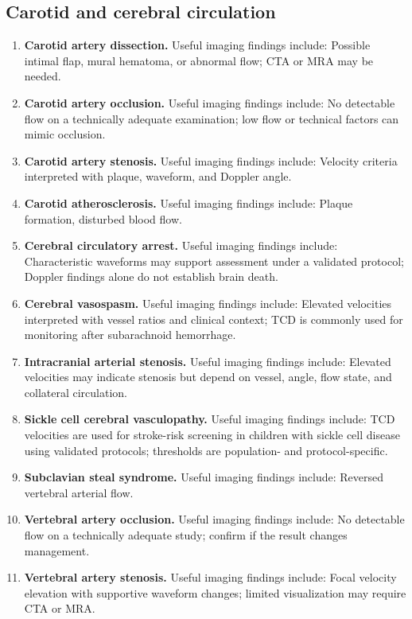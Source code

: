 \subsection{Carotid and cerebral circulation}
\begin{enumerate}[leftmargin=*,itemsep=0.45em,topsep=0.4em]
\item \textbf{Carotid artery dissection.} Useful imaging findings include: Possible intimal flap, mural hematoma, or abnormal flow; CTA or MRA may be needed.
\item \textbf{Carotid artery occlusion.} Useful imaging findings include: No detectable flow on a technically adequate examination; low flow or technical factors can mimic occlusion.
\item \textbf{Carotid artery stenosis.} Useful imaging findings include: Velocity criteria interpreted with plaque, waveform, and Doppler angle.
\item \textbf{Carotid atherosclerosis.} Useful imaging findings include: Plaque formation, disturbed blood flow.
\item \textbf{Cerebral circulatory arrest.} Useful imaging findings include: Characteristic waveforms may support assessment under a validated protocol; Doppler findings alone do not establish brain death.
\item \textbf{Cerebral vasospasm.} Useful imaging findings include: Elevated velocities interpreted with vessel ratios and clinical context; TCD is commonly used for monitoring after subarachnoid hemorrhage.
\item \textbf{Intracranial arterial stenosis.} Useful imaging findings include: Elevated velocities may indicate stenosis but depend on vessel, angle, flow state, and collateral circulation.
\item \textbf{Sickle cell cerebral vasculopathy.} Useful imaging findings include: TCD velocities are used for stroke-risk screening in children with sickle cell disease using validated protocols; thresholds are population- and protocol-specific.
\item \textbf{Subclavian steal syndrome.} Useful imaging findings include: Reversed vertebral arterial flow.
\item \textbf{Vertebral artery occlusion.} Useful imaging findings include: No detectable flow on a technically adequate study; confirm if the result changes management.
\item \textbf{Vertebral artery stenosis.} Useful imaging findings include: Focal velocity elevation with supportive waveform changes; limited visualization may require CTA or MRA.
\end{enumerate}

